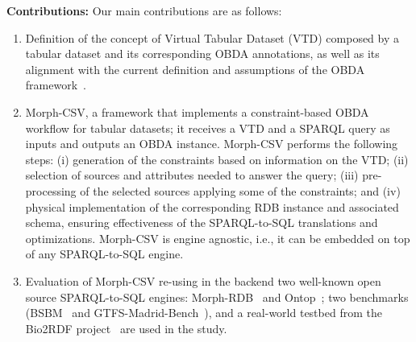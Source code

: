 \noindent\textbf{Contributions:} Our main contributions are as follows:
\begin{enumerate}
\item Definition of the concept of Virtual Tabular Dataset (VTD) composed by a tabular dataset and its corresponding OBDA annotations, as well as its alignment with the current definition and assumptions of the OBDA framework~\citep{xiao2018obdasurvey}.
\item Morph-CSV, a framework that implements a constraint-based OBDA workflow for tabular datasets; it receives a VTD and a SPARQL query as inputs and outputs an OBDA instance. Morph-CSV performs the following steps: (i) generation of the constraints based on information on the VTD; (ii) selection of sources and attributes needed to answer the query; (iii) pre-processing of the selected sources applying some of the constraints; and (iv) physical implementation of the corresponding RDB instance and associated schema, ensuring effectiveness of the SPARQL-to-SQL translations and optimizations. Morph-CSV is engine agnostic, i.e., it can be embedded on top of any SPARQL-to-SQL engine.
\item Evaluation of Morph-CSV re-using in the backend two well-known open source SPARQL-to-SQL engines: Morph-RDB~\citep{priyatna2014formalisation} and Ontop~\citep{calvanese2017ontop}; two benchmarks (BSBM~\citep{bizer2009berlin} and GTFS-Madrid-Bench~\citep{chaves2020gtfs}), and a real-world testbed from the Bio2RDF project~\citep{belleau2008bio2rdf} are used in the study.
\end{enumerate}




